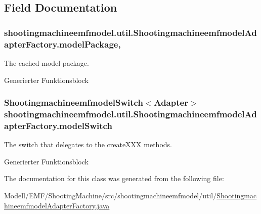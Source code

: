 \subsection{Field Documentation}
\hypertarget{classshootingmachineemfmodel_1_1util_1_1_shootingmachineemfmodel_adapter_factory_af64a58a889063d173052aced371c5398}{
\subsubsection[{model\-Package}]{ shootingmachineemfmodel.\-util.\-Shootingmachineemfmodel\-Adapter\-Factory.\-model\-Package\hspace{0.3cm}{\ttfamily [static]}, {\ttfamily [protected]}}}\label{classshootingmachineemfmodel_1_1util_1_1_shootingmachineemfmodel_adapter_factory_af64a58a889063d173052aced371c5398}
The cached model package.

Generierter Funktionsblock \hypertarget{classshootingmachineemfmodel_1_1util_1_1_shootingmachineemfmodel_adapter_factory_a38181f18235dbfb227e4bc5d1debe435}{
\subsubsection[{model\-Switch}]{\setlength{\rightskip}{0pt plus 5cm}Shootingmachineemfmodel\-Switch$<$Adapter$>$ shootingmachineemfmodel.\-util.\-Shootingmachineemfmodel\-Adapter\-Factory.\-model\-Switch\hspace{0.3cm}{\ttfamily [protected]}}}\label{classshootingmachineemfmodel_1_1util_1_1_shootingmachineemfmodel_adapter_factory_a38181f18235dbfb227e4bc5d1debe435}
The switch that delegates to the {\ttfamily create\-X\-X\-X} methods.

Generierter Funktionsblock 

The documentation for this class was generated from the following file\-:\begin{DoxyCompactItemize}
\item 
Modell/\-E\-M\-F/\-Shooting\-Machine/src/shootingmachineemfmodel/util/\hyperlink{_shootingmachineemfmodel_adapter_factory_8java}{Shootingmachineemfmodel\-Adapter\-Factory.\-java}\end{DoxyCompactItemize}
